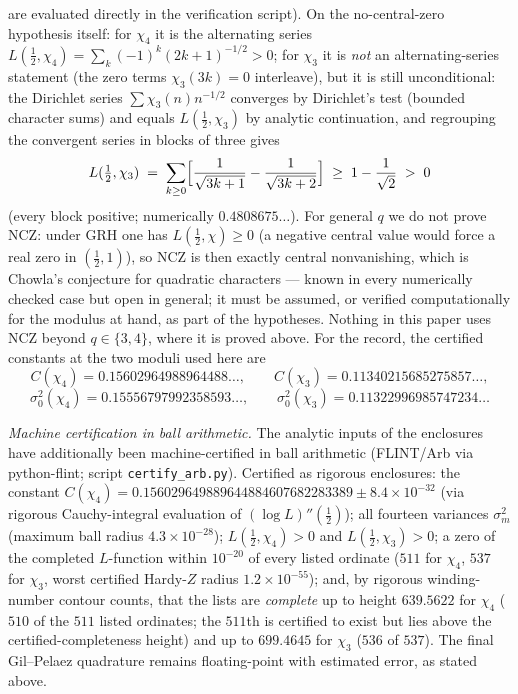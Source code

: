 \documentclass[11pt]{article}
\begin{document}
are evaluated directly in the verification script). On the
no-central-zero hypothesis itself: for $\chi_4$ it is the alternating
series $L(\tfrac12,\chi_4)=\sum_k(-1)^k(2k+1)^{-1/2}>0$; for $\chi_3$
it is \emph{not} an alternating-series statement (the zero terms
$\chi_3(3k)=0$ interleave), but it is still unconditional: the
Dirichlet series $\sum\chi_3(n)n^{-1/2}$ converges by Dirichlet's test
(bounded character sums) and equals $L(\tfrac12,\chi_3)$ by analytic
continuation, and regrouping the convergent series in blocks of three
gives
\[
L(\tfrac12,\chi_3)\;=\;\sum_{k\ge0}
\Bigl[\frac1{\sqrt{3k+1}}-\frac1{\sqrt{3k+2}}\Bigr]
\;\ge\;1-\frac1{\sqrt2}\;>\;0
\]
(every block positive; numerically $0.4808675\ldots$). For general
$q$ we do not prove NCZ: under GRH one has $L(\tfrac12,\chi)\ge0$
(a negative central value would force a real zero in $(\tfrac12,1)$),
so NCZ is then exactly central nonvanishing, which is Chowla's
conjecture for quadratic characters --- known in every numerically
checked case but open in general; it must be assumed, or verified
computationally for the modulus at hand, as part of the hypotheses.
Nothing in this paper uses NCZ beyond $q\in\{3,4\}$, where it is proved
above. For the record, the certified constants at the two moduli used
here are
\[
C(\chi_4)=0.15602964988964488\ldots,\qquad
C(\chi_3)=0.11340215685275857\ldots,
\]
\[
\sigma_0^2(\chi_4)=0.15556797992358593\ldots,\qquad
\sigma_0^2(\chi_3)=0.11322996985747234\ldots
\]

\emph{Machine certification in ball arithmetic.} The analytic inputs of
the enclosures have additionally been machine-certified in ball
arithmetic (FLINT/Arb via python-flint; script
\texttt{certify\_arb.py}). Certified as rigorous enclosures: the
constant
$C(\chi_4)=0.156029649889644884607682283389\pm8.4\times10^{-32}$
(via rigorous Cauchy-integral evaluation of $(\log L)''(\tfrac12)$);
all fourteen variances $\sigma_m^2$ (maximum ball radius
$4.3\times10^{-28}$); $L(\tfrac12,\chi_4)>0$ and
$L(\tfrac12,\chi_3)>0$; a zero of the completed $L$-function within
$10^{-20}$ of every listed ordinate ($511$ for $\chi_4$, $537$ for
$\chi_3$, worst certified Hardy-$Z$ radius $1.2\times10^{-55}$); and,
by rigorous winding-number contour counts, that the lists are
\emph{complete} up to height $639.5622$ for $\chi_4$ ($510$ of the
$511$ listed ordinates; the $511$th is certified to exist but lies
above the certified-completeness height) and up to $699.4645$ for
$\chi_3$ ($536$ of $537$). The final Gil--Pelaez quadrature remains
floating-point with estimated error, as stated above.
\end{document}
